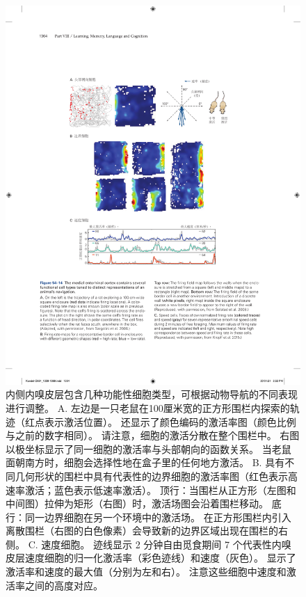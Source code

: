 \begin{figure}[htbp]
	\centering
	\includegraphics[width=0.93\linewidth]{chap54/fig_54_14}
	\caption{内侧内嗅皮层包含几种功能性细胞类型，可根据动物导航的不同表现进行调整。
		A. 左边是一只老鼠在100厘米宽的正方形围栏内探索的轨迹（红点表示激活位置）。
		还显示了颜色编码的激活率图（颜色比例与之前的数字相同）。
		请注意，细胞的激活分散在整个围栏中。
		右图以极坐标显示了同一细胞的激活率与头部朝向的函数关系。
		当老鼠面朝南方时，细胞会选择性地在盒子里的任何地方激活\cite{sargolini2006conjunctive}。
		B. 具有不同几何形状的围栏中具有代表性的边界细胞的激活率图（红色表示高速率激活；蓝色表示低速率激活）。
		顶行：当围栏从正方形（左图和中间图）拉伸为矩形（右图）时，激活场图会沿着围栏移动。
		底行：同一边界细胞在另一个环境中的激活场。
		在正方形围栏内引入离散围栏（右图的白色像素）会导致新的边界区域出现在围栏的右侧\cite{solstad2008representation}。
		C. 速度细胞。
		迹线显示 2 分钟自由觅食期间 7 个代表性内嗅皮层速度细胞的归一化激活率（彩色迹线）和速度（灰色）。
		显示了激活率和速度的最大值（分别为左和右）。
		注意这些细胞中速度和激活率之间的高度对应\cite{kropff2015speed}。}
	\label{fig:54_14}
\end{figure}


